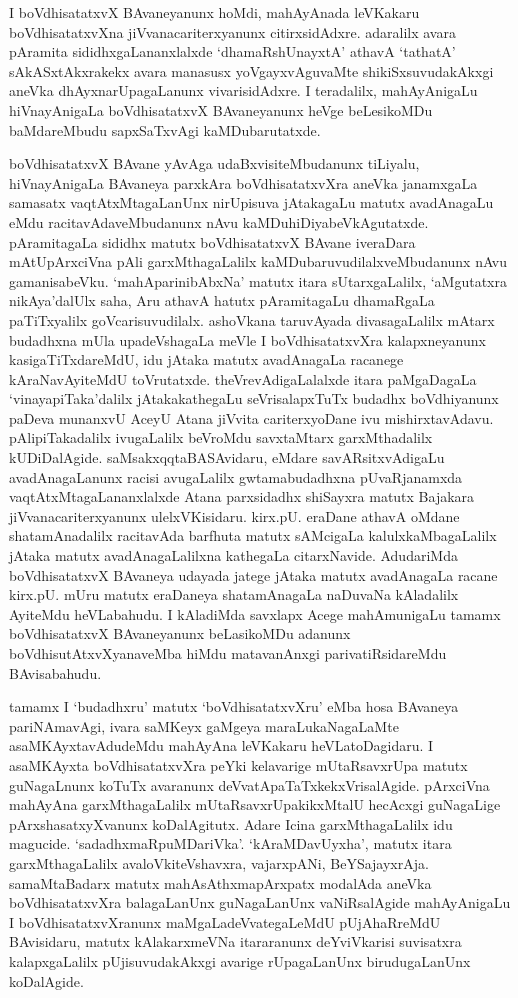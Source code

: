 I boVdhisatatxvX BAvaneyanunx hoMdi, mahAyAnada leVKakaru boVdhisatatxvXna jiVvanacariterxyanunx citirxsidAdxre. adaralilx avara pAramita sididhxgaLananxlalxde `dhamaR\break\-shUnayxtA' athavA `tathatA' sAkASxtAkxrakekx avara manasusx yoVgayxvAguvaMte shikiSxsu\-vudakAkxgi aneVka dhAyxnarUpagaLanunx vivarisidAdxre. I teradalilx, mahAyAnigaLu hiVnayAnigaLa boVdhisatatxvX BAvaneyanunx heVge beLesikoMDu baMdareMbudu sapxSaTxvAgi kaMDubarutatxde.

boVdhisatatxvX BAvane yAvAga udaBxvisiteMbudanunx tiLiyalu, hiVnayAnigaLa BAvaneya parxkAra boVdhisatatxvXra aneVka janamxgaLa samasatx vaqtAtxMtagaLanUnx nirUpisuva jAtakagaLu matutx avadAnagaLu eMdu racitavAdaveMbudanunx nAvu kaMDuhiDiya\break\-beVkAgutatxde. pAramitagaLa sididhx matutx boVdhisatatxvX BAvane iveraDara mAtU\break pArxciVna pAli garxMthagaLalilx kaMDubaruvudilalxveMbudanunx nAvu gamanisabeVku. `mahA\-parinibAbxNa' matutx itara sUtarxgaLalilx, `aMgutatxra nikAya'dalUlx saha, Aru athavA hatutx pAramitagaLu dhamaRgaLa paTiTxyalilx goVcarisuvudilalx. ashoVkana taruvAyada divasagaLalilx mAtarx budadhxna mUla upadeVshagaLa meVle I boVdhisatatxvXra kalapxneyanunx kasigaTiTxdareMdU, idu jAtaka matutx avadAnagaLa racanege kAraNavAyiteMdU toVrutatxde. theVrevAdigaLalalxde itara paMgaDagaLa `vinayapiTaka'dalilx jAtakakathegaLu seVrisalapxTuTx budadhx boVdhiyanunx paDeva munanxvU AceyU Atana jiVvita cariterxyoDane ivu mishirxtavAdavu. pAlipiTakadalilx ivugaLalilx beVroMdu savxtaMtarx garxMthadalilx kUDiDalAgide. saMsakxqqtaBASAvidaru, eMdare savARsitxvAdigaLu avadAnagaLanunx racisi avugaLalilx gwtamabudadhxna pUvaRjanamxda vaqtAtxMtagaLananxlalxde Atana parxsidadhx shiSayxra matutx Bajakara jiVvanacariterxyanunx ulelxVKisidaru. kirx.pU. eraDane athavA oMdane shatamAnadalilx racitavAda barfhuta matutx sAMcigaLa kalulxkaMbagaLalilx jAtaka matutx avadAnagaLalilxna kathegaLa citarxNavide. AdudariMda boVdhisatatxvX BAvaneya udayada jatege jAtaka matutx avadAnagaLa racane kirx.pU. mUru matutx eraDaneya shatamAnagaLa naDuvaNa kAladalilx AyiteMdu heVLabahudu. I kAladiMda savxlapx Acege mahAmunigaLu tamamx boVdhisatatxvX BAvaneyanunx beLasikoMDu adanunx boVdhisutAtxvXyanaveMba hiMdu matavanAnxgi parivatiRsidareMdu BAvisabahudu.

tamamx I `budadhxru' matutx `boVdhisatatxvXru' eMba hosa BAvaneya pariNAma\-vAgi, ivara saMKeyx gaMgeya maraLukaNagaLaMte asaMKAyxtavAdudeMdu mahAyAna leVKakaru heVLatoDagidaru. I asaMKAyxta boVdhisatatxvXra peYki kelavarige mUtaRsavxrUpa matutx guNagaLnunx koTuTx avaranunx deVvatApaTaTxkekxVrisalAgide. pArxciVna mahAyAna garxMthagaLalilx mUtaRsavxrUpakikxMtalU hecAcxgi guNagaLige pArxshasatxyXvanunx koDalAgitutx. Adare Icina garxMthagaLalilx idu magucide. `sadadhxmaRpuMDariVka'. `kAraMDavUyxha', matutx itara garxMthagaLalilx avaloVkiteVshavxra, vajarxpANi, BeYSajayxrAja. samaMtaBadarx matutx mahAsAthxmapArxpatx modalAda aneVka boVdhisatatxvXra balagaLanUnx guNagaLanUnx vaNiRsalAgide mahAyAnigaLu I boVdhisatatxvXranunx maMgaLadeVvategaLeMdU pUjAhaRreMdU BAvisidaru, matutx kAlakarxmeVNa itararanunx deYviVkarisi suvisatxra kalapxgaLalilx pUjisuvudakAkxgi avarige rUpagaLanUnx birudugaLanUnx koDalAgide.


